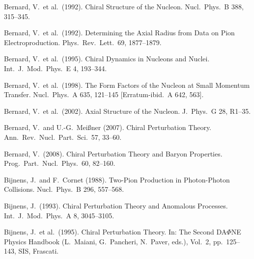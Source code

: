 \documentclass[twoside,12pt]{article}
\begin{document}
\begin{thebibliography}{}
Bernard, V.~et al.~(1992).
Chiral Structure of the Nucleon.
Nucl.\ Phys.\  B 388, 315--345.

Bernard, V.~et al.~(1992).
Determining the Axial Radius from Data on Pion Electroproduction.
Phys.\ Rev.\ Lett.\  69, 1877--1879.

Bernard, V.~et al.~(1995).
Chiral Dynamics in Nucleons and Nuclei.
Int.\ J.\ Mod.\ Phys.\  E 4, 193--344.

Bernard, V.~et al.~(1998).
The Form Factors of the Nucleon at Small Momentum Transfer.
Nucl.\ Phys.\  A 635, 121--145
[Erratum-ibid.\  A 642, 563].

Bernard, V.~et al.~(2002).
Axial Structure of the Nucleon.
J.\ Phys.\ G 28, R1--35.

Bernard, V.~and U.-G.~Mei{\ss}ner (2007).
Chiral Perturbation Theory.
Ann.\ Rev.\ Nucl.\ Part.\ Sci.\ 57, 33--60.


Bernard, V.~(2008).
Chiral Perturbation Theory and Baryon Properties.
Prog.\ Part.\ Nucl.\ Phys.\ 60, 82--160.

Bijnens, J.~and F.~Cornet (1988).
Two-Pion Production in Photon-Photon Collisions.
Nucl.\ Phys.\  B 296, 557--568.

Bijnens, J.~(1993).
Chiral Perturbation Theory and Anomalous Processes.
Int.\ J.\ Mod.\ Phys.\  A 8, 3045--3105.

Bijnens, J.~et al.~(1995).
Chiral Perturbation Theory. In:
The Second DA$\Phi$NE Physics Handbook (L.~Maiani, G.~Pancheri, N.~Paver,
eds.), Vol.~2, pp.~125--143, SIS, Frascati.


\end{thebibliography}
\end{document}
